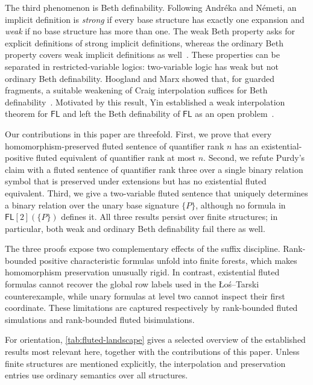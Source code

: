 \documentclass{lmcs}
\newcommand{\FL}{\mathsf{FL}}
\begin{document}
The third phenomenon is Beth definability.  Following Andr\'eka and N\'emeti,
an implicit definition is \emph{strong} if every base structure has exactly
one expansion and \emph{weak} if no base structure has more than one.  The weak
Beth property asks for explicit definitions of strong implicit definitions,
whereas the ordinary Beth property covers weak implicit definitions as
well~\cite{AndrekaNemeti2021}.  These properties can be separated in
restricted-variable logics: two-variable logic has weak but not ordinary Beth
definability.  Hoogland and Marx showed that, for guarded
fragments, a suitable weakening of Craig interpolation suffices for Beth
definability~\cite{HooglandMarx2002}.  Motivated by this result, Yin established
a weak interpolation theorem for $\FL$ and left the Beth definability of $\FL$
as an open problem~\cite{YinSavingCraig2026}.

Our contributions in this paper are threefold.  First, we prove that every
homomorphism-preserved fluted sentence of quantifier rank $n$ has an
existential-positive fluted equivalent of quantifier rank at most $n$.
Second, we refute Purdy's claim with a fluted sentence of
quantifier rank three over a single binary relation symbol that is preserved
under extensions but has no existential fluted equivalent.  Third, we give a
two-variable fluted sentence that uniquely determines a binary relation over
the unary base signature $\{P\}$, although no formula in
$\FL[2](\{P\})$ defines it.  All three results persist over finite
structures; in particular, both weak and ordinary Beth definability fail
there as well.

The three proofs expose two complementary effects of the suffix discipline.
Rank-bounded positive characteristic formulas unfold into finite forests, which makes
homomorphism preservation unusually rigid.  In contrast, existential fluted
formulas cannot recover the global row labels used in the \L o\'s--Tarski
counterexample, while unary formulas at level two cannot inspect their first
coordinate.  These limitations are captured respectively by rank-bounded
fluted simulations and rank-bounded fluted bisimulations.

For orientation, \cref{tab:fluted-landscape} gives a selected overview of the
established results most relevant here, together with the contributions of
this paper.  Unless finite structures are mentioned explicitly, the
interpolation and preservation entries use ordinary semantics over all
structures.
\end{document}
